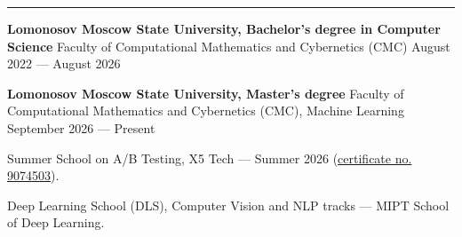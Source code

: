 \documentclass[10pt,a4paper]{article}
\newcommand{\cvsection}[1]{%
  \vspace{5pt}{\large\bfseries #1}\par\vspace{2pt}\hrule\vspace{3pt}}
\newcommand{\cventry}[3]{%
  \textbf{#1} \textbar{} #3 \textbar{} #2\par\vspace{1pt}}
\begin{document}
\cvsection{Education}
\cventry{Lomonosov Moscow State University, Bachelor's degree in Computer Science}{August 2022 --- August 2026}{Faculty of Computational Mathematics and Cybernetics (CMC)}
\vspace{2pt}
\cventry{Lomonosov Moscow State University, Master's degree}{September 2026 --- Present}{Faculty of Computational Mathematics and Cybernetics (CMC), Machine Learning}
\begin{cvitems}
    \item Summer School on A/B Testing, X5 Tech --- Summer 2026 (\href{https://drive.google.com/file/d/1mUnPwkYkO6VxMJelwePo0Ie6PKA6IBot/view?usp=sharing}{certificate no. 9074503}).
    \item Deep Learning School (DLS), Computer Vision and NLP tracks --- MIPT School of Deep Learning.
\end{cvitems}
\end{document}
